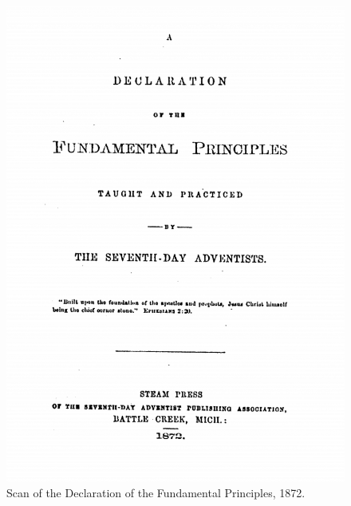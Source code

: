 \begin{figure}
    \centering
    \includegraphics[width=1\linewidth]{images/declaration-of-the-fundamental-principles.PNG}
    \caption*{Scan of the Declaration of the Fundamental Principles, 1872.}
    \label{fig:declaration-of-the-fundamental-principles}
\end{figure}


